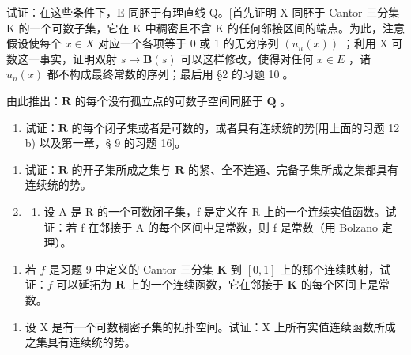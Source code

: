 试证：在这些条件下，E 同胚于有理直线 Q。{[}首先证明 X 同胚于 Cantor 三分集 K 的一个可数子集，它在 K 中稠密且不含 K 的任何邻接区间的端点。为此，注意假设使每个 \(x \in X\) 对应一个各项等于 0 或 1 的无穷序列 \((u_{n}(x))\) ；利用 X 可数这一事实，证明双射 \(s \to \mathbf{B}(s)\) 可以这样修改，使得对任何 \(x \in E\) ，诸 \(u_{n}(x)\) 都不构成最终常数的序列；最后用 §2 的习题 10{]}。

由此推出：\(\mathbf{R}\) 的每个没有孤立点的可数子空间同胚于 \(\mathbf{Q}\) 。

\begin{enumerate}
\def\labelenumi{\arabic{enumi})}
\setcounter{enumi}{13}
\tightlist
\item
试证：\(\mathbf{R}\) 的每个闭子集或者是可数的，或者具有连续统的势{[}用上面的习题 12 b) 以及第一章，§ 9 的习题 16{]}。
\end{enumerate}


\begin{enumerate}
\def\labelenumi{\arabic{enumi})}
\setcounter{enumi}{14}
\item
试证：\(\mathbf{R}\) 的开子集所成之集与 \(\mathbf{R}\) 的紧、全不连通、完备子集所成之集都具有连续统的势。
\item
  \begin{enumerate}
  \def\labelenumii{\alph{enumii})}
  \tightlist
  \item
设 A 是 R 的一个可数闭子集，f 是定义在 R 上的一个连续实值函数。试证：若 f 在邻接于 A 的每个区间中是常数，则 f 是常数（用 Bolzano 定理）。
  \end{enumerate}
\end{enumerate}

\begin{enumerate}
\def\labelenumi{\alph{enumi})}
\setcounter{enumi}{1}
\tightlist
\item
若 \(f\) 是习题 9 中定义的 Cantor 三分集 \(\mathbf{K}\) 到 \([0, 1]\) 上的那个连续映射，试证：\(f\) 可以延拓为 \(\mathbf{R}\) 上的一个连续函数，它在邻接于 \(\mathbf{K}\) 的每个区间上是常数。
\end{enumerate}

\begin{enumerate}
\def\labelenumi{\arabic{enumi})}
\setcounter{enumi}{16}
\tightlist
\item
设 X 是有一个可数稠密子集的拓扑空间。试证：X 上所有实值连续函数所成之集具有连续统的势。
\end{enumerate}
\relax{}
